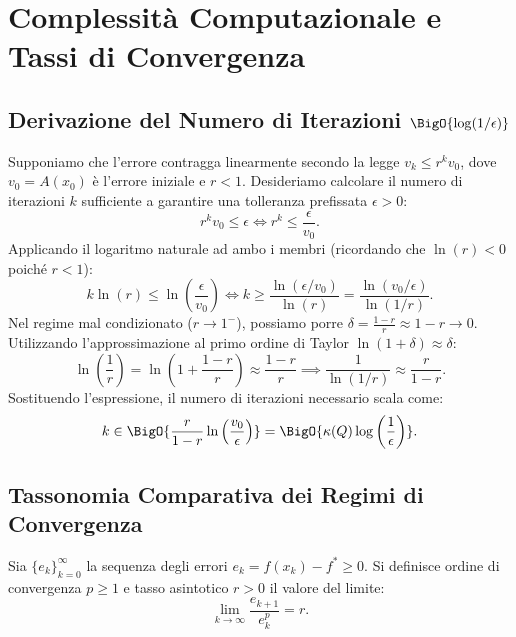 \FloatBarrier
\section{Complessit\`a Computazionale e Tassi di Convergenza}
\label{sec:complessita-tassi-convergenza}

\subsection[Derivazione del Numero di Iterazioni O(log(1/epsilon))]{Derivazione del Numero di Iterazioni $\BigO{\log(1/\epsilon)}$}
Supponiamo che l'errore contragga linearmente secondo la legge $v_k \le r^k v_0$, dove $v_0 = A(x_0)$ \`e l'errore iniziale e $r < 1$. Desideriamo calcolare il numero di iterazioni $k$ sufficiente a garantire una tolleranza prefissata $\epsilon > 0$:
\begin{equation}
    r^k v_0 \le \epsilon \iff r^k \le \frac{\epsilon}{v_0}.
\end{equation}
Applicando il logaritmo naturale ad ambo i membri (ricordando che $\ln(r) < 0$ poich\'e $r < 1$):
\begin{equation}
    k \ln(r) \le \ln\left( \frac{\epsilon}{v_0} \right) \iff k \ge \frac{\ln(\epsilon / v_0)}{\ln(r)} = \frac{\ln(v_0 / \epsilon)}{\ln(1/r)}.
\end{equation}
Nel regime mal condizionato ($r \to 1^-$), possiamo porre $\delta = \frac{1 - r}{r} \approx 1 - r \to 0$. Utilizzando l'approssimazione al primo ordine di Taylor $\ln(1 + \delta) \approx \delta$:
\begin{equation}
    \ln\left( \frac{1}{r} \right) = \ln\left( 1 + \frac{1 - r}{r} \right) \approx \frac{1 - r}{r} \implies \frac{1}{\ln(1/r)} \approx \frac{r}{1 - r}.
\end{equation}
Sostituendo l'espressione, il numero di iterazioni necessario scala come:
\begin{equation}
    k \in \BigO{\frac{r}{1 - r} \ln\left( \frac{v_0}{\epsilon} \right)} = \BigO{\kappa(Q) \log\left( \frac{1}{\epsilon} \right)}.
\end{equation}

\subsection{Tassonomia Comparativa dei Regimi di Convergenza}

\begin{definition}
Sia $\{e_k\}_{k=0}^\infty$ la sequenza degli errori $e_k = f(x_k) - f^* \ge 0$. Si definisce ordine di convergenza $p \ge 1$ e tasso asintotico $r > 0$ il valore del limite:
\begin{equation}
    \lim_{k \to \infty} \frac{e_{k+1}}{e_k^p} = r.
\end{equation}
\end{definition}

